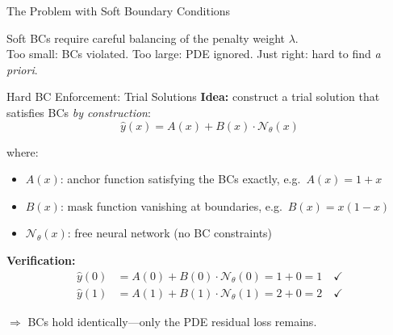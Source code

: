 \documentclass[aspectratio=169,11pt]{beamer}
\newcommand{\emphc}[1]{\textcolor{harvardcrimson}{#1}}
\begin{document}
\begin{frame}{The Problem with Soft Boundary Conditions}
\vspace{0.4em}
\begin{center}
{\small Soft BCs require \emphc{careful balancing} of the penalty weight $\lambda$.\\
Too small: BCs violated. Too large: PDE ignored. Just right: hard to find \emph{a priori}.}
\end{center}
\end{frame}

\begin{frame}{Hard BC Enforcement: Trial Solutions}
\textbf{Idea:} construct a \emphc{trial solution} that satisfies BCs \emph{by construction}:
\[
\boxed{
\hat{y}(x) = A(x) + B(x)\cdot\mathcal{N}_\theta(x)
}
\]

\vspace{0.2em}
where:
\begin{itemize}
    \item $A(x)$: \emphc{anchor function} satisfying the BCs exactly, e.g.\ $A(x) = 1 + x$
    \item $B(x)$: \emphc{mask function} vanishing at boundaries, e.g.\ $B(x) = x(1-x)$
    \item $\mathcal{N}_\theta(x)$: free neural network (no BC constraints)
\end{itemize}

\vspace{0.3em}
\textbf{Verification:}
\begin{align*}
\hat{y}(0) &= A(0) + B(0)\cdot\mathcal{N}_\theta(0) = 1 + 0 = 1 \quad\checkmark\\
\hat{y}(1) &= A(1) + B(1)\cdot\mathcal{N}_\theta(1) = 2 + 0 = 2 \quad\checkmark
\end{align*}

$\Rightarrow$ BCs hold \emphc{identically}---only the PDE residual loss remains.
\end{frame}
\end{document}
